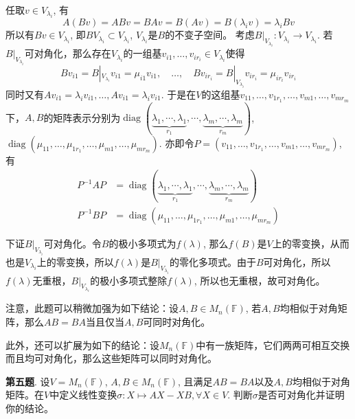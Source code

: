 任取$v \in V_{\lambda_i}$, 有
$$A(Bv) = ABv = BAv = B(Av) = B(\lambda_i v) = \lambda_i Bv$$
所以有$Bv \in V_{\lambda_i}$, 即$BV_{\lambda_i} \subset V_{\lambda_i}$, $V_{\lambda_i}$是$B$的不变子空间。 考虑$B|_{V_{\lambda_i}}: V_{\lambda_i} \to V_{\lambda_i}$. 若$B|_{V_{\lambda_i}}$可对角化，那么存在$V_{\lambda_i}$的一组基$v_{i1},\ldots,v_{ir_i} \in V_{\lambda_i}$使得
$$B v_{i1} = B|_{V_{\lambda_i}} v_{i1} = \mu_{i1} v_{i1}, \quad \ldots, \quad  B v_{ir_i} = B|_{V_{\lambda_i}} v_{ir_i} = \mu_{ir_i} v_{ir_i}$$
同时又有$A v_{i1} = \lambda_i v_{i1}, \ldots, A v_{i1} = \lambda_i v_{i1}$. 于是在$V$的这组基$v_{11}, \ldots, v_{1r_1}, \ldots, v_{m1}, \ldots, v_{mr_m}$下，$A,B$的矩阵表示分别为$\operatorname{diag} (\underbrace{\lambda_1,\cdots,\lambda_1}_{r_1}, \cdots, \underbrace{\lambda_m,\cdots,\lambda_m}_{r_m})$, $\operatorname{diag} (\mu_{11}, \ldots, \mu_{1r_1}, \ldots, \mu_{m1}, \ldots, \mu_{mr_m})$. 亦即令$P = (v_{11}, \ldots, v_{1r_1}, \ldots, v_{m1}, \ldots, v_{mr_m})$, 有
\begin{align*}
P^{-1}AP & = \operatorname{diag} (\underbrace{\lambda_1,\cdots,\lambda_1}_{r_1}, \cdots, \underbrace{\lambda_m,\cdots,\lambda_m}_{r_m}) \\
P^{-1}BP & = \operatorname{diag} (\mu_{11}, \ldots, \mu_{1r_1}, \ldots, \mu_{m1}, \ldots, \mu_{mr_m})
\end{align*}

下证$B|_{V_{\lambda_i}}$可对角化。令$B$的极小多项式为$f(\lambda)$, 那么$f(B)$是$V$上的零变换，从而也是$V_{\lambda_i}$上的零变换，所以$f(\lambda)$是$B|_{V_{\lambda_i}}$的零化多项式。由于$B$可对角化，所以$f(\lambda)$无重根，$B|_{V_{\lambda_i}}$的极小多项式整除$f(\lambda)$, 所以也无重根，故可对角化。

注意，此题可以稍微加强为如下结论：设$A, B \in M_n(\mathbb{F})$, 若$A,B$均相似于对角矩阵，那么$AB=BA$当且仅当$A,B$可同时对角化。

此外，还可以扩展为如下的结论：设$M_n(\mathbb{F})$中有一族矩阵，它们两两可相互交换而且均可对角化，那么这些矩阵可以同时对角化。


\newpageorvspace


{\bf 第五题}. 设$V = M_n (\mathbb{F})$, $A,B \in M_n (\mathbb{F})$, 且满足$AB=BA$以及$A,B$均相似于对角矩阵。在$V$中定义线性变换$\sigma: X \mapsto AX - XB, \forall X \in V$. 判断$\sigma$是否可对角化并证明你的结论。

